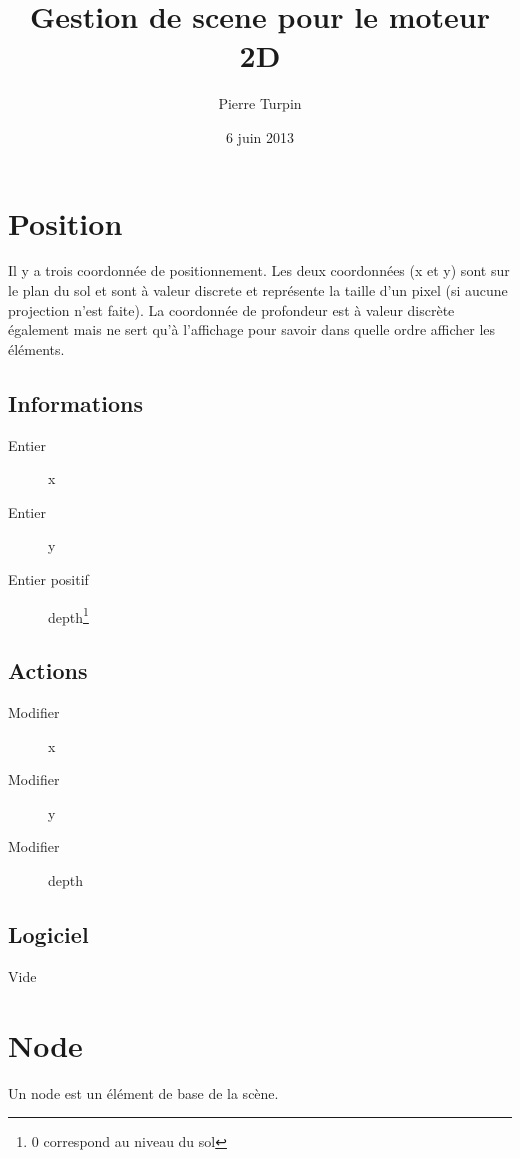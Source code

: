 \documentclass[11pt, a4paper]{article}
\begin{document}
\title{Gestion de scene pour le moteur 2D}
\author{Pierre Turpin}
\date{6 juin 2013}

\maketitle

\tableofcontents
\newpage

\section{Position}
Il y a trois coordonnée de positionnement.
Les deux coordonnées (x et y) sont sur le plan du sol et sont à valeur discrete et représente la taille d'un pixel (si aucune projection n'est faite).
La coordonnée de profondeur est à valeur discrète également mais ne sert qu'à l'affichage pour savoir dans quelle ordre afficher les éléments.

\subsection{Informations}
\begin{description}
\item[Entier] x
\item[Entier] y
\item[Entier positif] depth\footnote{0 correspond au niveau du sol}
\end{description}

\subsection{Actions}
\begin{description}
\item[Modifier] x
\item[Modifier] y
\item[Modifier] depth
\end{description}

\subsection{Logiciel}
Vide

\section{Node}
Un node est un élément de base de la scène.
\end{document}

